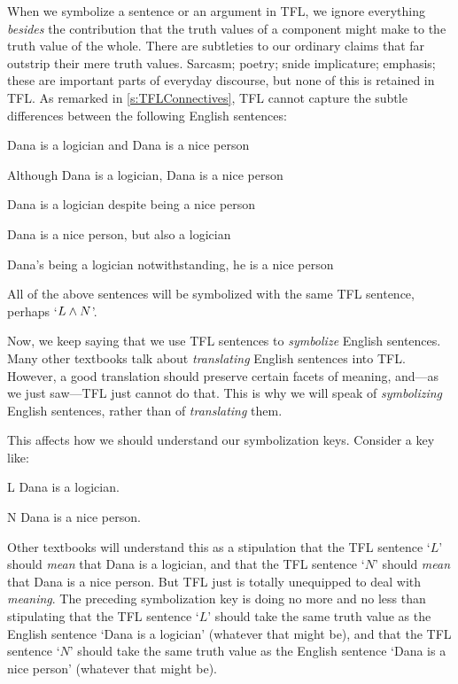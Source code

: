 When we symbolize a sentence or an argument in TFL, we ignore everything \emph{besides} the contribution that the truth values of a component might make to the truth value of the whole. There are subtleties to our ordinary claims that far outstrip their mere truth values. Sarcasm; poetry; snide implicature; emphasis; these are important parts of everyday discourse, but none of this is retained in TFL. As remarked in \cref{s:TFLConnectives}, TFL cannot capture the subtle differences between the following English sentences:
	\begin{compactlist}
		\item Dana is a logician and Dana is a nice person
		\item Although Dana is a logician, Dana is a nice person
		\item Dana is a logician despite being a nice person
		\item Dana is a nice person, but also a logician
		\item Dana's being a logician notwithstanding, he is a nice person
	\end{compactlist}
All of the above sentences will be symbolized with the same TFL sentence, perhaps `$L \wedge N$'.

Now, we keep saying that we use TFL sentences to \emph{symbolize} English sentences. Many other textbooks talk about \emph{translating} English sentences into TFL. However, a good translation should preserve certain facets of meaning, and---as we just saw---TFL just cannot do that. This is why we will speak of \emph{symbolizing} English sentences, rather than of \emph{translating} them.

This affects how we should understand our symbolization keys. Consider a key like:
	\begin{ekey}
		\item[L] Dana is a logician.
		\item[N] Dana is a nice person.
	\end{ekey}
Other textbooks will understand this as a stipulation that the TFL sentence `$L$' should \emph{mean} that Dana is a logician, and that the TFL sentence `$N$' should \emph{mean} that Dana is a nice person. But TFL just is totally unequipped to deal with \emph{meaning}. The preceding symbolization key is doing no more and no less than stipulating that the TFL sentence `$L$' should take the same truth value as the English sentence `Dana is a logician' (whatever that might be), and that the TFL sentence `$N$' should take the same truth value as the English sentence `Dana is a nice person' (whatever that might be).


